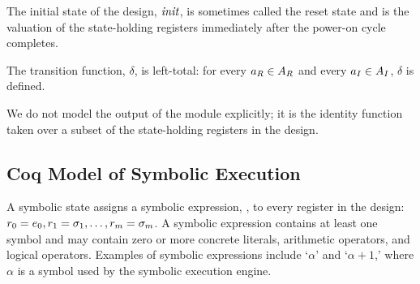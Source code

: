 The initial state of the design, $\mathit{init}$, is sometimes called the reset state and is the
valuation of the state-holding registers immediately after the power-on
cycle completes.

The transition function, $\delta$, is left-total: for every
$a_{R} \in A_{R}$ and every
$a_{I} \in A_{I}$, $\delta$ is
defined.

We do not model the output of the
module explicitly; it is the identity function taken over a subset of the
state-holding registers in the design.




\subsection{Coq Model of Symbolic Execution}
A symbolic state assigns a symbolic expression, \symexpression, to every register in the design: $r_0 =
e_0, r_1 = \sigma_1, \ldots, r_m = \sigma_m$. A symbolic expression
\symexpression{} contains at least one symbol and may contain zero or more concrete
literals, arithmetic operators, and logical operators. Examples of
symbolic expressions include `$\alpha$' and `$\alpha + 1$,' where
$\alpha$ is a symbol used by the symbolic execution engine.

